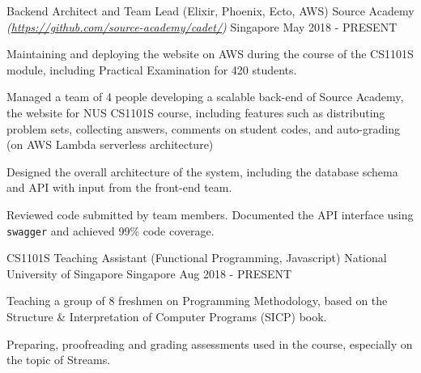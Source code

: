 \begin{cventries}
	\cventry
		{Backend Architect and Team Lead (Elixir, Phoenix, Ecto, AWS)} %
		{Source Academy \textmd{\em\tiny(\url{https://github.com/source-academy/cadet/})}} %
		{Singapore} %
		{May 2018 - PRESENT} %
		{
			\begin{cvitems}
				\item {Maintaining and deploying the website on AWS during the course of the CS1101S module, including Practical Examination for 420 students.}
				\item {Managed a team of 4 people developing a scalable back-end of Source Academy, the website for NUS CS1101S course, including features such as distributing problem sets, collecting answers, comments on student codes, and auto-grading (on AWS Lambda serverless architecture)}
				\item {Designed the overall architecture of the system, including the database schema and API with input from the front-end team.}
				\item {Reviewed code submitted by team members. Documented the API interface using \texttt{swagger} and achieved 99\% code coverage.}
			\end{cvitems}
		}
	\cventry
		{CS1101S Teaching Assistant (Functional Programming, Javascript)} %
		{National University of Singapore} %
		{Singapore} %
		{Aug 2018 - PRESENT} %
		{
			\begin{cvitems}
				\item {Teaching a group of 8 freshmen on Programming Methodology, based on the Structure \& Interpretation of Computer Programs (SICP) book.}
				\item {Preparing, proofreading and grading assessments used in the course, especially on the topic of Streams.}
			\end{cvitems}
		}

\end{cventries}
